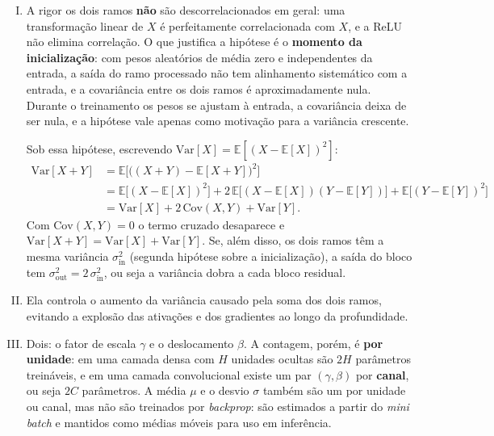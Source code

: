 \documentclass{dlproblemset}
\begin{document}
\begin{enumerate}[I)]

   \item A rigor os dois ramos \textbf{não} são descorrelacionados em geral: uma transformação linear de $X$ é perfeitamente correlacionada com $X$, e a ReLU não elimina correlação. O que justifica a hipótese é o \textbf{momento da inicialização}: com pesos aleatórios de média zero e independentes da entrada, a saída do ramo processado não tem alinhamento sistemático com a entrada, e a covariância entre os dois ramos é aproximadamente nula. Durante o treinamento os pesos se ajustam à entrada, a covariância deixa de ser nula, e a hipótese vale apenas como motivação para a variância crescente.

   Sob essa hipótese, escrevendo $\mathrm{Var}[X] = \mathbb{E}[(X - \mathbb{E}[X])^2]$:
   \begin{align*}
       \mathrm{Var}[X+Y] &= \mathbb{E}\bigl[\bigl((X+Y) - \mathbb{E}[X+Y]\bigr)^2\bigr] \\
                          &= \mathbb{E}\bigl[(X - \mathbb{E}[X])^2\bigr] + 2\,\mathbb{E}\bigl[(X - \mathbb{E}[X])(Y - \mathbb{E}[Y])\bigr] + \mathbb{E}\bigl[(Y - \mathbb{E}[Y])^2\bigr] \\
                          &= \mathrm{Var}[X] + 2\,\mathrm{Cov}(X,Y) + \mathrm{Var}[Y].
   \end{align*}
   Com $\mathrm{Cov}(X,Y) = 0$ o termo cruzado desaparece e $\mathrm{Var}[X+Y] = \mathrm{Var}[X] + \mathrm{Var}[Y]$. Se, além disso, os dois ramos têm a mesma variância $\sigma_\text{in}^2$ (segunda hipótese sobre a inicialização), a saída do bloco tem $\sigma_\text{out}^2 = 2\,\sigma_\text{in}^2$, ou seja a variância dobra a cada bloco residual.

   \item Ela controla o aumento da variância causado pela soma dos dois ramos, evitando a explosão das ativações e dos gradientes ao longo da profundidade.

   \item Dois: o fator de escala $\gamma$ e o deslocamento $\beta$. A contagem, porém, é \textbf{por unidade}: em uma camada densa com $H$ unidades ocultas são $2H$ parâmetros treináveis, e em uma camada convolucional existe um par $(\gamma, \beta)$ por \textbf{canal}, ou seja $2C$ parâmetros. A média $\mu$ e o desvio $\sigma$ também são um por unidade ou canal, mas não são treinados por \textit{backprop}: são estimados a partir do \textit{mini batch} e mantidos como médias móveis para uso em inferência.


\end{enumerate}
\end{document}
